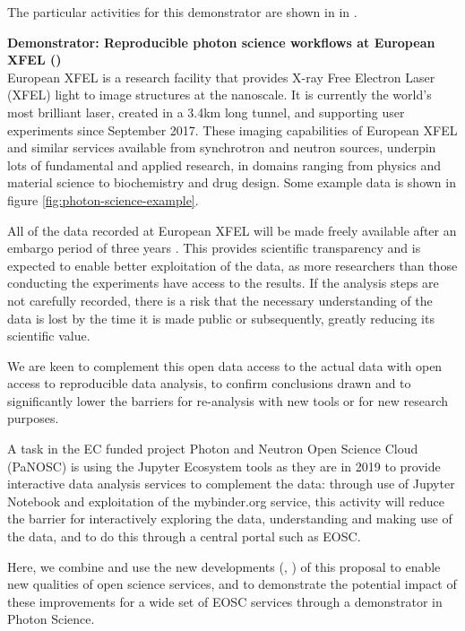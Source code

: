  The particular activities for this demonstrator are shown in
   in .

\medskip
\noindent\textbf{Demonstrator: Reproducible photon science workflows at
  European XFEL ()}\label{sec:concept-demonstrator-photonscience}\\


  European XFEL is a research facility that provides X-ray Free
  Electron Laser (XFEL) light to image structures at the nanoscale. It
  is currently the world's most brilliant laser, created in a 3.4km
  long tunnel, and supporting user experiments since September
  2017. These imaging capabilities of European XFEL and similar
  services available from synchrotron and neutron sources, underpin lots of
  fundamental and applied research, in domains ranging from
  physics and material science to biochemistry and drug design. Some
  example data is shown in figure \ref{fig:photon-science-example}.

  All of the data recorded at European XFEL will be made freely
  available after an embargo period of three years
  \cite{EuXFEL-datapolicy-2017}. This provides scientific transparency
  and is expected to enable better exploitation of the data, as more
  researchers than those conducting the experiments have access to the
  results. If the analysis steps are not carefully recorded, there is a risk
  that the necessary understanding of the data is lost by the time it
  is made public or subsequently, greatly reducing its scientific
  value.

  We are keen to complement this open data access to the actual data
  with open access to reproducible data analysis, to confirm
  conclusions drawn and to significantly lower the barriers for
  re-analysis with new tools or for new research purposes.

  A task in the EC funded project Photon and Neutron Open Science
  Cloud (PaNOSC) is using the Jupyter Ecosystem tools as they are in
  2019 to provide interactive data analysis services to complement the
  data: through use of Jupyter Notebook and exploitation of the
  mybinder.org service, this activity will reduce the barrier for
  interactively exploring the data, understanding and making use of
  the data, and to do this through a central portal such as EOSC.

  Here, we combine and use the new developments (,
  ) of this
  proposal to enable new qualities of open science services, and to
  demonstrate the potential impact of these improvements for a wide
  set of EOSC services through a demonstrator in Photon Science.

